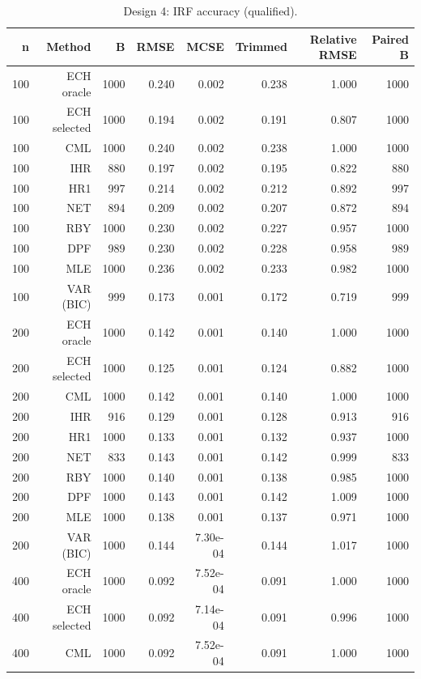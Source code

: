\begin{table}[p]\centering
\caption{Design 4: IRF accuracy (qualified).}
\small
\begin{tabular}{rrrrrrrr}\toprule
n & Method & B & RMSE & MCSE & Trimmed & Relative RMSE & Paired B \\\midrule
100 & ECH oracle & 1000 & 0.240 & 0.002 & 0.238 & 1.000 & 1000 \\
100 & ECH selected & 1000 & 0.194 & 0.002 & 0.191 & 0.807 & 1000 \\
100 & CML & 1000 & 0.240 & 0.002 & 0.238 & 1.000 & 1000 \\
100 & IHR &  880 & 0.197 & 0.002 & 0.195 & 0.822 &  880 \\
100 & HR1 &  997 & 0.214 & 0.002 & 0.212 & 0.892 &  997 \\
100 & NET &  894 & 0.209 & 0.002 & 0.207 & 0.872 &  894 \\
100 & RBY & 1000 & 0.230 & 0.002 & 0.227 & 0.957 & 1000 \\
100 & DPF &  989 & 0.230 & 0.002 & 0.228 & 0.958 &  989 \\
100 & MLE & 1000 & 0.236 & 0.002 & 0.233 & 0.982 & 1000 \\
100 & VAR (BIC) &  999 & 0.173 & 0.001 & 0.172 & 0.719 &  999 \\
200 & ECH oracle & 1000 & 0.142 & 0.001 & 0.140 & 1.000 & 1000 \\
200 & ECH selected & 1000 & 0.125 & 0.001 & 0.124 & 0.882 & 1000 \\
200 & CML & 1000 & 0.142 & 0.001 & 0.140 & 1.000 & 1000 \\
200 & IHR &  916 & 0.129 & 0.001 & 0.128 & 0.913 &  916 \\
200 & HR1 & 1000 & 0.133 & 0.001 & 0.132 & 0.937 & 1000 \\
200 & NET &  833 & 0.143 & 0.001 & 0.142 & 0.999 &  833 \\
200 & RBY & 1000 & 0.140 & 0.001 & 0.138 & 0.985 & 1000 \\
200 & DPF & 1000 & 0.143 & 0.001 & 0.142 & 1.009 & 1000 \\
200 & MLE & 1000 & 0.138 & 0.001 & 0.137 & 0.971 & 1000 \\
200 & VAR (BIC) & 1000 & 0.144 & 7.30e-04 & 0.144 & 1.017 & 1000 \\
400 & ECH oracle & 1000 & 0.092 & 7.52e-04 & 0.091 & 1.000 & 1000 \\
400 & ECH selected & 1000 & 0.092 & 7.14e-04 & 0.091 & 0.996 & 1000 \\
400 & CML & 1000 & 0.092 & 7.52e-04 & 0.091 & 1.000 & 1000 \\

\end{tabular}
\end{table}
